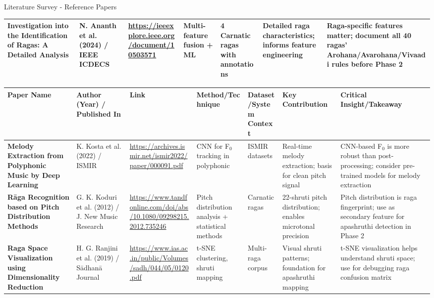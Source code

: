 \documentclass[aspectratio=169,11pt]{beamer}
\begin{document}
\begin{frame}[allowframebreaks]{Literature Survey - Reference Papers}
{\begin{longtable}{p{1.6cm}|p{1.3cm}|p{1.5cm}|p{1.6cm}|p{1.6cm}|p{1.6cm}|p{1.8cm}}
				\textbf{Investigation into the Identification of Ragas: A Detailed Analysis} & N. Ananth et al. (2024) / IEEE ICDECS & \url{https://ieeexplore.ieee.org/document/10503571} & Multi-feature fusion + ML & 4 Carnatic ragas with annotations & Detailed raga characteristics; informs feature engineering & Raga-specific features matter; document all 40 ragas' Arohana/Avarohana/Vivaadi rules before Phase 2 \\
				\bottomrule
			\end{longtable}
		}
		
		\framebreak
		
		{\tiny
			\begin{longtable}{p{1.6cm}|p{1.3cm}|p{1.5cm}|p{1.6cm}|p{1.6cm}|p{1.6cm}|p{1.8cm}}
				\toprule
				\textbf{Paper Name} & \textbf{Author (Year) / Published In} & \textbf{Link} & \textbf{Method/Technique} & \textbf{Dataset/System Context} & \textbf{Key Contribution} & \textbf{Critical Insight/Takeaway} \\
				\midrule
				
				\textbf{Melody Extraction from Polyphonic Music by Deep Learning} & K. Kosta et al. (2022) / ISMIR & \url{https://archives.ismir.net/ismir2022/paper/000091.pdf} & CNN for F$_0$ tracking in polyphonic & ISMIR datasets & Real-time melody extraction; basis for clean pitch signal & CNN-based F$_0$ is more robust than post-processing; consider pre-trained models for melody extraction \\
				\addlinespace
				
				\textbf{Rāga Recognition based on Pitch Distribution Methods} & G. K. Koduri et al. (2012) / J. New Music Research & \url{https://www.tandfonline.com/doi/abs/10.1080/09298215.2012.735246} & Pitch distribution analysis + statistical methods & Carnatic ragas & 22-shruti pitch distribution; enables microtonal precision & Pitch distribution is raga fingerprint; use as secondary feature for apashruthi detection in Phase 2 \\
				\addlinespace
				
				\textbf{Raga Space Visualization using Dimensionality Reduction} & H. G. Ranjini et al. (2019) / Sādhanā Journal & \url{https://www.ias.ac.in/public/Volumes/sadh/044/05/0120.pdf} & t-SNE clustering, shruti mapping & Multi-raga corpus & Visual shruti patterns; foundation for apashruthi mapping & t-SNE visualization helps understand shruti space; use for debugging raga confusion matrix \\
				\bottomrule
			\end{longtable}
		}
		

\end{frame}
\end{document}
